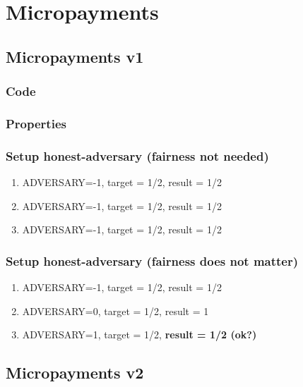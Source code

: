 \documentclass{article}
\begin{document}
\section{Micropayments}

\subsection{Micropayments v1}

\subsubsection{Code}



\subsubsection{Properties}



\subsubsection{Setup honest-adversary (fairness not needed)}

\begin{enumerate}
\item ADVERSARY=-1, target = 1/2, result = 1/2
\item ADVERSARY=-1, target = 1/2, result = 1/2
\item ADVERSARY=-1, target = 1/2, result = 1/2
\end{enumerate}

\subsubsection{Setup honest-adversary (fairness does not matter)}

\begin{enumerate}
\item ADVERSARY=-1, target = 1/2, result = 1/2
\item ADVERSARY=0, target = 1/2, result = 1
\item ADVERSARY=1, target = 1/2, \textbf{result = 1/2 (ok?)}
\end{enumerate}

\subsection{Micropayments v2}
\end{document}
